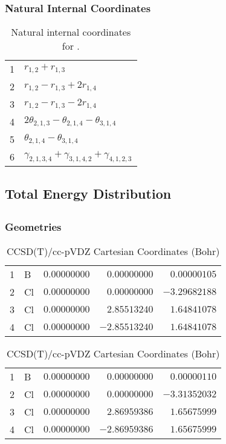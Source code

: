 \documentclass[10pt,oneside]{article}
\begin{document}
\begin{table}[h!]
\subsubsection*{Natural Internal Coordinates}
\centering
\caption{Natural internal coordinates for .}
\small
\begin{tabular}{ll}
\toprule
  1   & $r_{1,2} + r_{1,3}$ \\
  2   & $r_{1,2} - r_{1,3} + 2r_{1,4}$ \\
  3   & $r_{1,2} - r_{1,3} - 2r_{1,4}$ \\
  4   & $2\theta_{2,1,3} - \theta_{2,1,4} - \theta_{3,1,4}$ \\
  5   & $\theta_{2,1,4} - \theta_{3,1,4}$ \\
  6   & $\gamma_{2,1,3,4} + \gamma_{3,1,4,2} + \gamma_{4,1,2,3}$ \\
\bottomrule
\end{tabular}
\end{table}

\begin{table}
\subsection*{Total Energy Distribution}
\centering\end{table}

\clearpage

\subsection{}

\begin{table}[h!]
\subsubsection*{Geometries}
\begin{multicols}{2}
\centering
\caption{CCSD(T)/cc-pVTZ Cartesian Coordinates (Bohr)}
\begin{tabular}{llrrr}
\toprule
1  & B  & $ 0.00000000$ & $ 0.00000000$ & $ 0.00000105$ \\
2  & Cl & $ 0.00000000$ & $ 0.00000000$ & $-3.29682188$ \\
3  & Cl & $ 0.00000000$ & $ 2.85513240$ & $ 1.64841078$ \\
4  & Cl & $ 0.00000000$ & $-2.85513240$ & $ 1.64841078$ \\
\bottomrule
\end{tabular}
\caption{CCSD(T)/cc-pVDZ Cartesian Coordinates (Bohr)}
\begin{tabular}{llrrr}
\toprule
1  & B  & $ 0.00000000$ & $ 0.00000000$ & $ 0.00000110$ \\
2  & Cl & $ 0.00000000$ & $ 0.00000000$ & $-3.31352032$ \\
3  & Cl & $ 0.00000000$ & $ 2.86959386$ & $ 1.65675999$ \\
4  & Cl & $ 0.00000000$ & $-2.86959386$ & $ 1.65675999$ \\
\bottomrule
\end{tabular}
\end{multicols}
\end{table}
\end{document}
